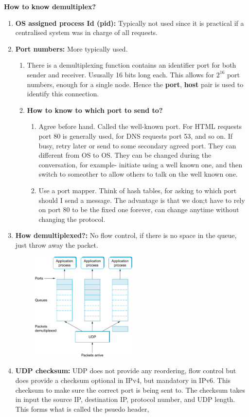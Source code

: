 \documentclass[11pt, a4paper]{article}
\begin{document}
\textbf{How to know demultiplex?}
\begin{enumerate}
    \item \textbf{OS assigned process Id (pid):} Typically not used since it is practical if a centralised system was in charge of all requests.
    \item \textbf{Port numbers: } More typically used.
    \begin{enumerate}
        \item There is a demultiplexing function contains an identifier port for both sender and receiver. Ususally 16 bits long each. This allows for $2^{16}$ port numbers, enough for a single node. Hence the \textbf{port}, \textbf{host} pair is used to identify this connection.
        \item \textbf{How to know to which port to send to?}
        \begin{enumerate}
            \item Agree before hand. Called the well-known port. For HTML requests port 80 is generally used, for DNS requests port 53, and so on. If busy, retry later or send to some secondary agreed port. They can different from OS to OS. They can be changed during the conversation, for example- initiate using a well known one, and then switch to someother to allow others to talk on the well known one.
            \item Use a port mapper. Think of hash tables, for asking to which port should I send a message. The advantage is that we don;t have to rely on port 80 to be the fixed one forever, can change anytime without changing the protocol.
        \end{enumerate}
    \end{enumerate}
        \item \textbf{How demultiplexed?: }  
    No flow control, if there is no space in the queue, just throw away the packet.
    \begin{figure}[H]
        \centering
        \includegraphics[width = 0.5\textwidth]{Pictures/UDP demultiplexing.png}
    \end{figure}
    \item \textbf{UDP checksum:} UDP does not provide any reordering, flow control but does provide a checksum optional in IPv4, but mandatory in IPv6. This checksum to make sure the correct port is being sent to. The checksum takes in input the source IP, destination IP, protocol number, and UDP length. This forms what is called the psuedo header,
\end{enumerate}
\end{document}
